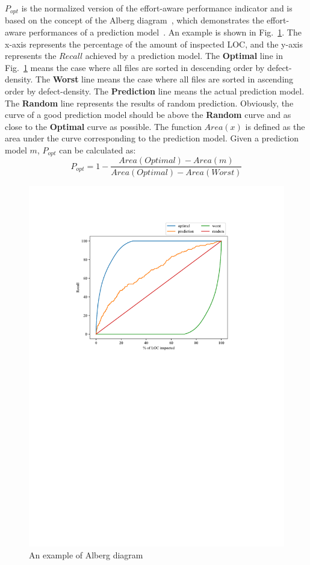 \documentclass[journal]{IEEEtran}
\begin{document}
$P_{opt}$ is the normalized version of the effort-aware performance indicator and is based on the concept of the Alberg diagram~\cite{mende2010effort}, which demonstrates the effort-aware performances of a prediction model~\cite{wang2018deep,zhou2018far,huang2019revisiting,yang2016effort}. An example is shown in Fig.~\ref{fig_popt}. The x-axis represents the percentage of the amount of inspected LOC, and the y-axis represents the $Recall$ achieved by a prediction model. The \textbf{Optimal} line in Fig.~\ref{fig_popt} 
means the case where all files are sorted in descending order by defect-density. The \textbf{Worst} line means the case where all files are sorted in ascending order by defect-density. The \textbf{Prediction} line means the actual prediction model. The \textbf{Random} line represents the results of random prediction. Obviously, the curve of a good prediction model should be above the \textbf{Random} curve and as close to the \textbf{Optimal} curve as possible. The function $Area(x)$ is defined as the area under the curve corresponding to the prediction model. Given a prediction model $m$, $P_{opt}$ can be calculated as:
\begin{equation}
P_{opt}=1-\frac{Area(Optimal)-Area(m)}{Area(Optimal)-Area(Worst)}
\end{equation}
\begin{figure}
	\centering
	\includegraphics[scale=0.6]{figs/popt.pdf}
	\caption{An example of Alberg diagram}
	\label{fig_popt}
\end{figure}
\end{document}
